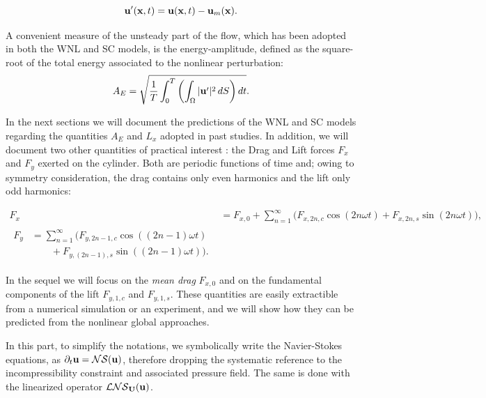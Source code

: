 \documentclass[twocolumn,10pt]{asme2ej}
\newcommand{\be}[1]{ \begin{equation} \label{#1}}
\newcommand{\ee}{\end{equation}}
\begin{document}
\be{defuprime}
{\bf u}'({\bf x},t) =   {\bf u}({\bf x},t)-  {\bf u}_m({\bf x}).
\ee

A convenient measure of the unsteady part of the flow, which has been adopted in both the WNL and SC models, is the energy-amplitude, defined as the square-root of the total energy associated to the nonlinear perturbation:
\be{defAnergy}
A_E = \sqrt{\frac{1}{T} \int_0^{T} \left( \int_\Omega | {\bf u}' |^2 \, dS \right) dt}.
\ee

In the next sections we will document the predictions of the WNL and SC models regarding the quantities $A_E$ and $L_x$ adopted in past studies. In addition, we will document two other quantities of practical interest : the Drag and Lift forces $F_x$ and $F_y$ exerted on the cylinder. 
Both are periodic functions of time and; owing to symmetry consideration, the drag contains only even harmonics and the lift only odd harmonics:

\begin{align}
F_x &=F_{x,0} + \sum_{n=1}^\infty \big( F_{x,2n,c} \cos ( 2 n \omega t) + F_{x,2n,s} \sin( 2 n  \omega t ) \big),
\\
\begin{split}
F_y  & =\sum_{n=1}^\infty \big( F_{y,{2n-1},c} \cos ((2n-1) \omega t )\\
             &\qquad + F_{y,(2n-1),s}  \sin ((2n-1) \omega t) \big).
\end{split}
\label{drag_lift_def}
\end{align}



In the sequel we will focus on the {\em mean drag}  $F_{x,0}$ and on the fundamental components of the lift  
$F_{y,1,c}$ and $F_{y,1,s}$. These quantities are easily extractible from a numerical simulation or an experiment, and we will
show how they can be predicted from the nonlinear global approaches.
 
  

 
 In this part, to simplify the notations, we symbolically write the Navier-Stokes equations, as $\partial_t {\bf u} = {\cal NS} ({\bf u})$, therefore dropping the systematic reference to the incompressibility constraint and associated pressure field. The same is done with the linearized operator ${\cal LNS}_{{\bf U}}( {\bf u})$.
   
\end{document}
